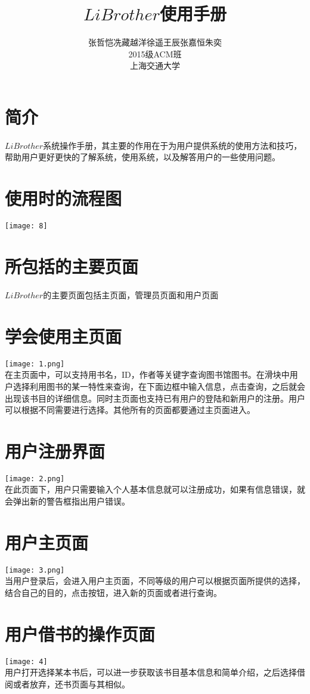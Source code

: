 \documentclass[UFT8]{ctexart}
\begin{document}
\title{$LiBrother$使用手册}
\author{张哲恺\quad 冼藏越洋\quad 徐遥\quad 王辰\quad 张嘉恒\quad 朱奕\\2015级ACM班\\上海交通大学}
\maketitle
\tableofcontents
\section{简介}
$LiBrother$系统操作手册，其主要的作用在于为用户提供系统的使用方法和技巧，帮助用户更好更快的了解系统，使用系统，以及解答用户的一些使用问题。
\section{使用时的流程图}
\texttt{[image: 8]}
\section{所包括的主要页面}
$LiBrother$的主要页面包括主页面，管理员页面和用户页面
\section{学会使用主页面}
\texttt{[image: 1.png]}\\
在主页面中，可以支持用书名，ID，作者等关键字查询图书馆图书。在滑块中用户选择利用图书的某一特性来查询，在下面边框中输入信息，点击查询，之后就会出现该书目的详细信息。同时主页面也支持已有用户的登陆和新用户的注册。用户可以根据不同需要进行选择。其他所有的页面都要通过主页面进入。
\section{用户注册界面}
\texttt{[image: 2.png]}\\
在此页面下，用户只需要输入个人基本信息就可以注册成功，如果有信息错误，就会弹出新的警告框指出用户错误。
\section{用户主页面}
\texttt{[image: 3.png]}\\
当用户登录后，会进入用户主页面，不同等级的用户可以根据页面所提供的选择，结合自己的目的，点击按钮，进入新的页面或者进行查询。
\section{用户借书的操作页面}
\texttt{[image: 4]}\\
用户打开选择某本书后，可以进一步获取该书目基本信息和简单介绍，之后选择借阅或者放弃，还书页面与其相似。
\end{document}
